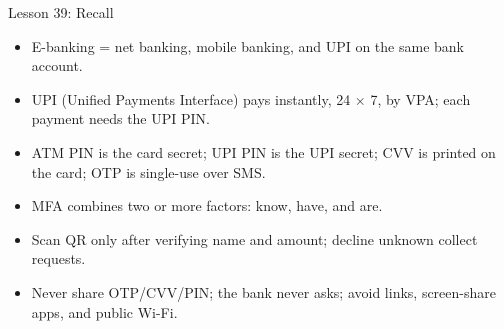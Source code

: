 \documentclass[aspectratio=169]{beamer}
\begin{document}
\begin{frame}{Lesson 39: Recall}
  \begin{itemize}
    \item E-banking = net banking, mobile banking, and UPI on the same bank
      account.
    \item UPI (Unified Payments Interface) pays instantly, 24 $\times$ 7, by
      VPA; each payment needs the UPI PIN.
    \item ATM PIN is the card secret; UPI PIN is the UPI secret; CVV is
      printed on the card; OTP is single-use over SMS.
    \item MFA combines two or more factors: know, have, and are.
    \item Scan QR only after verifying name and amount; decline unknown
      collect requests.
    \item Never share OTP/CVV/PIN; the bank never asks; avoid links,
      screen-share apps, and public Wi-Fi.
  \end{itemize}
\end{frame}
\end{document}
